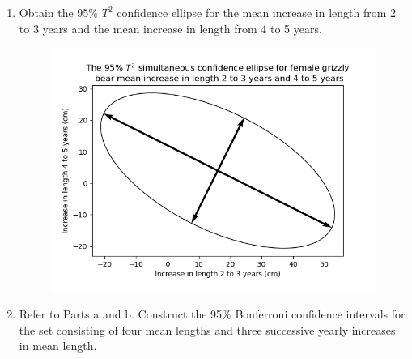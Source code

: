 \begin{enumerate}[label=(\alph*)]
    \[
        \textbf{a}_{i}^{\prime}\bar{\textbf{x}}
        \pm
        \sqrt{
            \frac{(n-1)p}{(n-p)}
            F_{p, n-p}
            \left(\alpha\right)
            }
        \sqrt{
            \frac{
                \textbf{a}_{i}^{\prime}
                \textbf{S}
                \textbf{a}_{i}
                }{
                    n
                }
            }
    \]
    \[
        \begin{NiceArray}{rrrr}
            16.00 \pm \sqrt{72.94} \frac{\sqrt{133.00}}{\sqrt{7}} & \text{contains }\mu_{1} & \text{ or } & -21.23 \leq \mu_{1} \leq 53.23 \\
            13.86 \pm \sqrt{72.94} \frac{\sqrt{128.48}}{\sqrt{7}} & \text{contains }\mu_{2} & \text{ or } & -22.73 \leq \mu_{2} \leq 50.45 \\
            4.00 \pm \sqrt{72.94} \frac{\sqrt{58.33}}{\sqrt{7}} & \text{contains }\mu_{3} & \text{ or } & -20.65 \leq \mu_{3} \leq 28.65
        \end{NiceArray}
    \]

    \item Obtain the 95\% $T^{2}$ confidence ellipse for the mean increase in length from 2 to 3 years and the mean increase in length from 4 to 5 years.
    
    \begin{figure}[H]
        \centering
            \includegraphics[scale=0.75]{./python/chapter-5/Question-5-10-c.png}
    \end{figure}
    
    \item Refer to Parts a and b. Construct the 95\% Bonferroni confidence intervals for the set consisting of four mean lengths and three successive yearly increases in mean length.
    

\end{enumerate}
